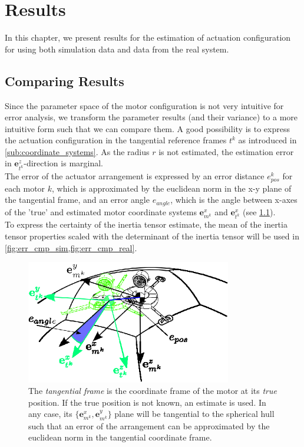 \chapter{Results}
\label{chap:simulation_results}
In this chapter, we present results for the estimation of actuation configuration for using both simulation data and data from the real system. \\

\section{Comparing Results}
Since the parameter space of the motor configuration is not very intuitive for error analysis,
we transform the parameter results (and their variance) to a more intuitive form such that we can compare them.
A good possibility is to express the actuation configuration in the tangential reference frames $t^k$ as introduced in \cref{sub:coordinate_systems}.
As the radius $r$ is not estimated, the estimation error in
$ \mathbf{e}_{t^k}^z $-direction is marginal.
\\
The error of the actuator arrangement is expressed by an error distance $e_{pos}^k$ for each motor $k$, which is approximated by the euclidean norm in the x-y plane of the tangential frame,
and an error angle $e_{angle}$, which is the angle between x-axes of the 'true' and estimated motor coordinate systems $\mathbf{e}_{m^k}^x$ and $\mathbf{e}_{t^k}^x$
(see \ref{fig:tangential_frame}).
\\
To express the certainty of the inertia tensor estimate, the mean of the inertia tensor properties scaled with the determinant of the inertia tensor will be used in \cref{fig:err_cmp_sim,fig:err_cmp_real}.

\begin{figure}[hbtp]
\centering
\includegraphics[width = 0.8\textwidth]{images/tangential_frame.eps}
\caption{The \textit{tangential frame} is the coordinate frame of the motor at its \textit{true} position. If the true position is not known, an estimate is used. In any case, its $\lbrace \mathbf{e}^x_{m^k} , \mathbf{e}^y_{m^k} \rbrace$ plane will be tangential to the spherical hull such that an error of the arrangement can be approximated by the euclidean norm in the tangential coordinate frame.}
\label{fig:tangential_frame}
\end{figure}

